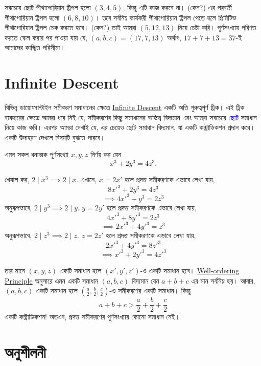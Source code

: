 \documentclass[11pt]{report}
\begin{document}
সবচেয়ে ছোট পীথাগোরিয়ান ট্রিপল হলো $(3,4,5)$, কিন্তু এটি কাজ করবে না। (কেন?) এর পরবর্তী পীথাগোরিয়ান ট্রিপল হলো $(6,8,10)$। তবে সর্বনিম্ন কার্যকরী পীথাগোরিয়ান ট্রিপল পেতে হলে প্রিমিটিভ পীথাগোরিয়ান ট্রিপল চেক করতে হবে। (কেন?) তাই আমরা $(5,12,13)$ নিয়ে চেষ্টা করি। পূর্ণসংখ্যায় পরিণত করতে স্কেল করার পর পাওয়া যায় যে, $(a,b,c) = (17,7,13)$ অর্থাৎ, $17+7+13=37$-ই আমাদের কাঙ্খিত পরিসীমা।\\

\section{Infinite Descent}

বিভিন্ন ডায়োফ্যান্টাইন সমীকরণ সমাধানের ক্ষেত্রে \href{https://en.wikipedia.org/wiki/Proof_by_infinite_descent}{Infinite Descent} একটি অতি গুরুত্বপূর্ণ ট্রিক। এই ট্রিক ব্যবহারের ক্ষেত্রে আমরা ধরে নিই যে, সমীকরণের কিছু সমাধানের অস্তিত্ব বিদ্যমান এবং আমরা সবচেয়ে \textcolor{blue}{ছোট} সমাধান নিয়ে কাজ করি। এরপর আমরা দেখাই যে, এর চেয়েও ছোট সমাধান বিদ্যমান, যা একটি কন্ট্রাডিকশন প্রদান করে। একটি উদাহরণ দেখলে বিষয়টি বুঝতে পারবে।\\

\begin{tcolorbox}[colframe=black!80!green,title=উদাহরণ 2.6.1]
এমন সকল ধনাত্মক পূর্ণসংখ্যা $x,y,z$ নির্ণয় কর যেন $$x^3+2y^3=4z^3.$$
\end{tcolorbox}

খেয়াল কর, $2 \mid x^3 \implies 2 \mid x$. এখানে, $x=2x'$ হলে প্রদত্ত সমীকরণকে এভাবে লেখা যায়, $$8x'^3+2y^3=4z^3$$ $$\implies 4x'^3+y^3=2z^3$$ অনুরূপভাবে, $2 \mid y^3 \implies 2 \mid y$. $y=2y'$ হলে প্রদত্ত সমীকরণকে এভাবে লেখা যায়, $$4x'^3+8y'^3=2z^3$$ $$\implies 2x'^3+4y'^3=z^3$$ অনুরূপভাবে, $2 \mid z^3 \implies 2 \mid z$. $z=2z'$ হলে প্রদত্ত সমীকরণকে এভাবে লেখা যায়, $$2x'^3+4y'^3=8z'^3$$ $$\implies x'^3+2y'^3=4z'^3$$

তার মানে $(x,y,z)$ একটি সমাধান হলে $(x',y',z')$-ও একটি সমাধান হবে। \href{https://en.wikipedia.org/wiki/Well-ordering_principle}{Well-ordering Principle} অনুসারে এমন একটি সমাধান $(a,b,c)$ বিদ্যমান যেন $a+b+c$ এর মান সর্বনিম্ন হয়। আবার, $(a,b,c)$ একটি সমাধান হলে $(\frac{a}{2},\frac{b}{2},\frac{c}{2})$-ও সমীকরণের একটি সমাধান। কিন্তু $$a+b+c > \frac{a}{2}+\frac{b}{2}+\frac{c}{2}$$ একটি কন্ট্রাডিকশন! অতএব, প্রদত্ত সমীকরণের পূর্ণসংখ্যায় কোনো সমাধান নেই।\\

\section{অনুশীলনী}
\end{document}

